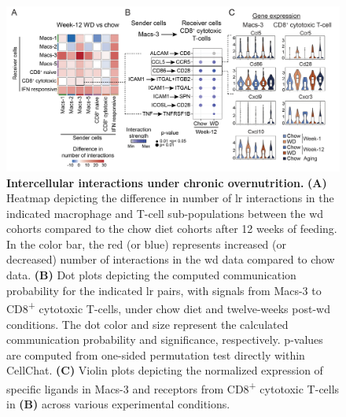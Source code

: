 \begin{figure}[t]
\centering
\includegraphics[width=\linewidth]{Chapter4/Fig/F2-7-01.png}
\caption[Intercellular interactions under chronic overnutrition]{\textbf{Intercellular interactions under chronic overnutrition.} \textbf{(A)} Heatmap depicting the difference in number of \gls{lr} interactions in the indicated macrophage and T-cell sub-populations between the \gls{wd} cohorts compared to the chow diet cohorts after 12 weeks of feeding. In the color bar, the red (or blue) represents increased (or decreased) number of interactions in the \gls{wd} data compared to chow data. \textbf{(B)} Dot plots depicting the computed communication probability for the indicated \gls{lr} pairs, with signals from Macs-3 to CD8\textsuperscript{+} cytotoxic T-cells, under chow diet and twelve-weeks post-\gls{wd} conditions. The dot color and size represent the calculated communication probability and significance, respectively. p-values are computed from one-sided permutation test directly within CellChat. \textbf{(C)} Violin plots depicting the normalized expression of specific ligands in Macs-3 and receptors from CD8\textsuperscript{+} cytotoxic T-cells in \textbf{(B)} across various experimental conditions.}
\label{fig:chp2_scrna_cellchat2}
\end{figure}

